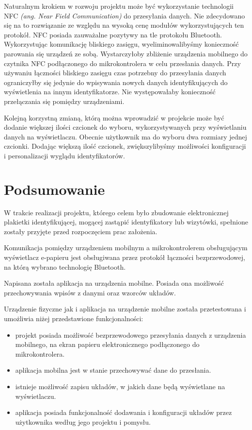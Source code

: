 \documentclass[a4paper,12pt, twoside]{article}
\begin{document}
        Naturalnym krokiem w rozwoju projektu może być wykorzystanie technologii NFC \textit{(ang. Near Field Communication)} do przesyłania danych. Nie zdecydowano się na to rozwiązanie ze względu na wysoką cenę modułów wykorzystujących ten protokół. NFC posiada zauważalne pozytywy na tle protokołu Bluetooth. Wykorzystując komunikację bliskiego zasięgu, wyeliminowalibyśmy konieczność parowania się urządzeń ze sobą. Wystarczyłoby zbliżenie urządzenia mobilnego do czytnika NFC podłączonego do mikrokontrolera w celu przesłania danych. Przy używaniu łączności bliskiego zasięgu czas potrzebny do przesyłania danych ograniczyłby się jedynie do wpisywania nowych danych identyfikujących do wyświetlenia na innym identyfikatorze. Nie występowałaby konieczność przełączania się pomiędzy urządzeniami.
    	
    	Kolejną korzystną zmianą, którą można wprowadzić w projekcie może być dodanie większej ilości czcionek do wyboru, wykorzystywanych przy wyświetlaniu danych na wyświetlaczu. Obecnie użytkownik ma do wyboru dwa rozmiary jednej czcionki. Dodając większą ilość czcionek, zwiększylibyśmy możliwości konfiguracji i personalizacji wyglądu identyfikatorów.

    	\section{Podsumowanie}
    	W trakcie realizacji projektu, którego celem było zbudowanie elektronicznej plakietki identyfikującej, mogącej zastąpić identyfikatory lub wizytówki, spełnione zostały przyjęte przed rozpoczęciem prac założenia.
    	
    	Komunikacja pomiędzy urządzeniem mobilnym a mikrokontrolerem obsługującym wyświetlacz e-papieru jest obsługiwana przez protokół łączności bezprzewodowej, na którą wybrano technologię Bluetooth.
    	
    	Napisana została aplikacja na urządzenia mobilne. Posiada ona możliwość przechowywania wpisów z danymi oraz wzorców układów.
    	
    	Urządzenie fizyczne jak i aplikacja na urządzenie mobilne została przetestowana i umożliwia niżej przedstawione funkcjonalności:
    	\begin{itemize}
    	    \item projekt posiada możliwość bezprzewodowego przesyłania danych z urządzenia mobilnego, na ekran papieru elektronicznego podłączonego do mikrokontrolera.
    	    \item aplikacja mobilna jest w stanie przechowywać dane do przesłania.
    	    \item istnieje możliwość zapisu układów, w jakich dane będą wyświetlane na wyświetlaczu.
    	    \item aplikacja posiada funkcjonalność dodawania i konfiguracji układów przez użytkownika według jego projektu i pomysłu.
    	\end{itemize}
    	
\end{document}
